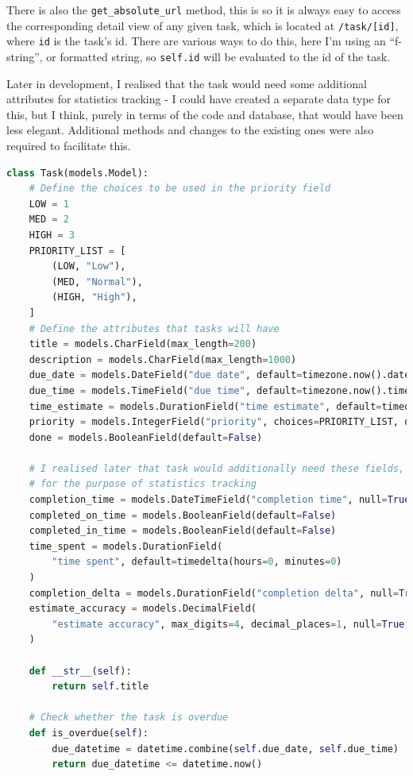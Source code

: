 \documentclass{article}
\begin{document}
There is also the \texttt{get\_absolute\_url} method,
this is so it is always easy to access the corresponding detail view of any given task,
which is located at \texttt{/task/[id]}, where \texttt{id} is the task's id.
There are various ways to do this,
here I'm using an ``f-string'',
or formatted string,
so \texttt{{self.id}} will be evaluated to the id of the task.

Later in development,
I realised that the task would need some additional attributes for statistics tracking -
I could have created a separate data type for this,
but I think,
purely in terms of the code and database,
that would have been less elegant.
Additional methods and changes to the existing ones were also required to facilitate this.

\begin{lstlisting}[language=Python]
class Task(models.Model):
    # Define the choices to be used in the priority field
    LOW = 1
    MED = 2
    HIGH = 3
    PRIORITY_LIST = [
        (LOW, "Low"),
        (MED, "Normal"),
        (HIGH, "High"),
    ]
    # Define the attributes that tasks will have
    title = models.CharField(max_length=200)
    description = models.CharField(max_length=1000)
    due_date = models.DateField("due date", default=timezone.now().date())
    due_time = models.TimeField("due time", default=timezone.now().time())
    time_estimate = models.DurationField("time estimate", default=timedelta(minutes=0))
    priority = models.IntegerField("priority", choices=PRIORITY_LIST, default=2)
    done = models.BooleanField(default=False)

    # I realised later that task would additionally need these fields,
    # for the purpose of statistics tracking
    completion_time = models.DateTimeField("completion time", null=True, blank=True)
    completed_on_time = models.BooleanField(default=False)
    completed_in_time = models.BooleanField(default=False)
    time_spent = models.DurationField(
        "time spent", default=timedelta(hours=0, minutes=0)
    )
    completion_delta = models.DurationField("completion delta", null=True, blank=True)
    estimate_accuracy = models.DecimalField(
        "estimate accuracy", max_digits=4, decimal_places=1, null=True, blank=True
    )

    def __str__(self):
        return self.title

    # Check whether the task is overdue
    def is_overdue(self):
        due_datetime = datetime.combine(self.due_date, self.due_time)
        return due_datetime <= datetime.now()


\end{lstlisting}
\end{document}

